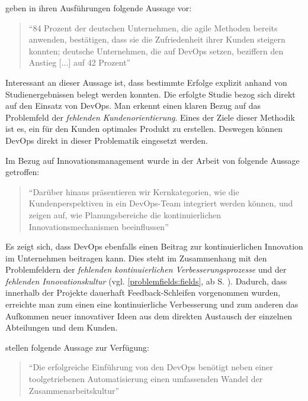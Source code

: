  geben in ihren Ausführungen folgende Aussage vor:

\begin{quote}
	``84 Prozent der deutschen Unternehmen, die agile Methoden bereits anwenden, bestätigen, dass sie die Zufriedenheit ihrer Kunden steigern konnten; deutsche Unternehmen, die auf DevOps setzen, beziffern den Anstieg [...] auf 42 Prozent'' \cite{drilling_agilitat_nodate}
\end{quote}

Interessant an dieser Aussage ist, dass bestimmte Erfolge explizit anhand von Studienergebnissen belegt werden konnten. Die erfolgte Studie bezog sich direkt auf den Einsatz  von DevOps. Man erkennt einen klaren Bezug auf das Problemfeld der \textit{fehlenden Kundenorientierung}. Eines der Ziele dieser Methodik ist es, ein für den Kunden optimales Produkt zu erstellen. Deswegen können DevOps direkt in dieser Problematik eingesetzt werden.

Im Bezug auf Innovationsmanagement wurde in der Arbeit von  folgende Aussage getroffen:

\begin{quote}
	``Darüber hinaus präsentieren wir Kernkategorien, wie die Kundenperspektiven in ein DevOps-Team integriert werden können, und zeigen auf, wie Planungsbereiche die kontinuierlichen Innovationsmechanismen beeinflussen'' \cite[S. 1]{wiedemann_implementing_2019} 
\end{quote}

Es zeigt sich, dass DevOps ebenfalls einen Beitrag zur kontinuierlichen Innovation im Unternehmen beitragen kann. Dies steht im Zusammenhang mit den Problemfeldern der \textit{fehlenden kontinuierlichen Verbesserungsprozesse} und der \textit{fehlenden Innovationskultur} (vgl. \ref{problemfields:fields}, ab S. \pageref{problemfields:fields}). Dadurch, dass innerhalb der Projekte dauerhaft Feedback-Schleifen vorgenommen wurden, erreichte man zum einen eine kontinuierliche Verbesserung und zum anderen das Aufkommen neuer innovativer Ideen aus dem direkten Austausch der einzelnen Abteilungen und dem Kunden.

 stellen folgende Aussage zur Verfügung:

\begin{quote}
	``Die erfolgreiche Einführung von den DevOps benötigt neben einer toolgetriebenen Automatisierung einen umfassenden Wandel der Zusammenarbeitskultur'' \cite[S. 53]{alt_innovationsorientiertes_2017}
\end{quote}

